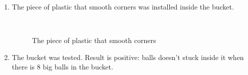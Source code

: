 \begin{enumerate}
\begin{enumerate}
\begin{figure}[H]
		 		         \end{figure}	
		\item The piece of plastic that smooth corners was installed inside the bucket.	
		 		         \begin{figure}[H]
		 		         	\begin{minipage}[h]{0.2\linewidth}
		 		         		\center  
		 		         	\end{minipage}
		 		         	\begin{minipage}[h]{0.6\linewidth}
		 		         		\caption{The piece of plastic that smooth corners}
		 		         	\end{minipage}
		 		         \end{figure}		
		\item The bucket was tested. Result is positive: balls doesn't stuck inside it when there is 8 big balls in the bucket.
		

\end{enumerate}
\end{enumerate}
